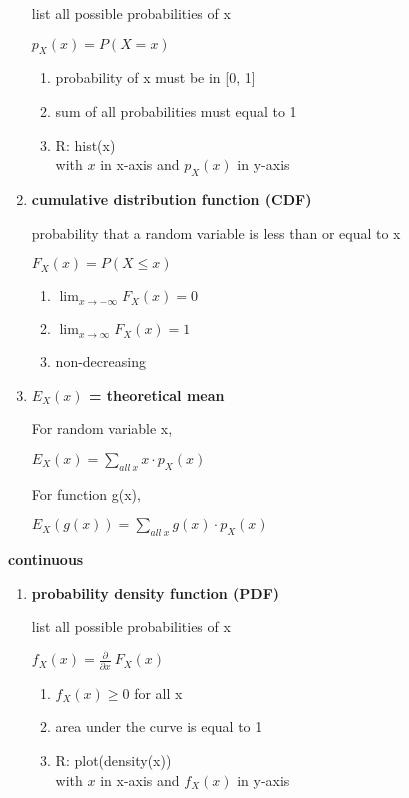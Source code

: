 \documentclass{article}
\begin{document}
\begin{small}
\begin{multicols}{2}
\begin{enumerate}
list all possible probabilities of x

$p_X(x) = P(X = x)$

\begin{enumerate}
\item probability of x must be in [0, 1]
\item sum of all probabilities must equal to 1
\item R: hist(x) \\ with $x$ in x-axis and $p_X(x)$ in y-axis
\end{enumerate}

\item\textbf{cumulative distribution function (CDF)}

probability that a random variable is less than or equal to x

$F_X(x) = P(X \leq x)$

\begin{enumerate}
\item $\lim_{x\to-\infty} F_X(x) = 0$
\item $\lim_{x\to\infty} F_X(x) = 1$
\item non-decreasing
\end{enumerate}

\item\textbf{$E_X(x)$ = theoretical mean}

For random variable x, 

$E_X(x) = \sum_{all \ x} x \cdot p_X(x)$

For function g(x), 

$E_X(g(x)) = \sum_{all \ x} g(x) \cdot p_X(x)$

\end{enumerate}

\columnbreak

\textbf{continuous}
\begin{enumerate}
\item\textbf{probability density function (PDF)}

list all possible probabilities of x

$f_X(x) = \frac{\partial}{\partial x} \ F_X(x)$

\begin{enumerate}
\item $f_X(x) \ge 0$ for all x
\item area under the curve is equal to 1
\item R: plot(density(x)) \\ with $x$ in x-axis and $f_X(x)$ in y-axis
\end{enumerate}


\end{enumerate}
\end{multicols}
\end{small}
\end{document}
